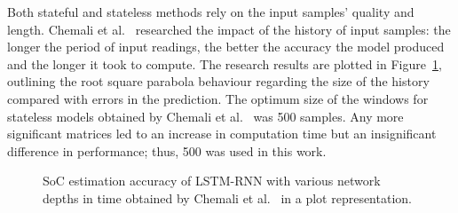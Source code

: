 %
 {
    
} {
    Both stateful and stateless methods rely on the input samples' quality and length.
    Chemali et al.~\cite{Chemali2017} researched the impact of the history of input samples: the longer the period of input readings, the better the accuracy the model produced and the longer it took to compute.
    The research results are plotted in \mbox{Figure~\ref{fig:chemali-accuracy}}, outlining the root square parabola behaviour regarding the size of the history compared with errors in the prediction.
    The optimum size of the windows for stateless models obtained by Chemali et al.~\cite{Chemali2017} was 500 samples.
    Any more significant matrices led to an increase in computation time but an insignificant difference in performance; thus, 500 was used in this work.
}
\begin{figure}[H]
    
    \caption{SoC estimation accuracy of LSTM-RNN with various network depths in time obtained by Chemali et al.~\cite{Chemali2017} in a plot representation.}
    \label{fig:chemali-accuracy}
\end{figure}

